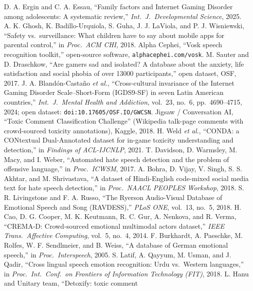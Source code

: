 D. A. Ergin and C. A. Essau, ``Family factors and Internet Gaming
Disorder among adolescents: A systematic review,'' \emph{Int.\ J.\ Developmental
Science}, 2025.
 A. K. Ghosh, K. Badillo-Urquiola, S. Guha, J. J. LaViola, and
P. J. Wisniewski, ``Safety vs.\ surveillance: What children have to say about mobile apps for
parental control,'' in \emph{Proc.\ ACM CHI}, 2018.
 Alpha Cephei, ``Vosk speech recognition toolkit,'' open-source
software, \texttt{alphacephei.com/vosk}.
 M. Sauter and D. Draschkow, ``Are gamers sad and isolated? A
database about the anxiety, life satisfaction and social phobia of over 13000
participants,'' open dataset, OSF, 2017.
 J. A. Bland\'on-Casta\~no \emph{et al.}, ``Cross-cultural invariance of
the Internet Gaming Disorder Scale--Short-Form (IGDS9-SF) in seven Latin American countries,''
\emph{Int.\ J.\ Mental Health and Addiction}, vol.~23, no.~6, pp.~4690--4715, 2024;
open dataset: \texttt{doi:10.17605/OSF.IO/GWCSN}.
 Jigsaw / Conversation AI, ``Toxic Comment Classification
Challenge'' (Wikipedia talk-page comments with crowd-sourced toxicity annotations),
Kaggle, 2018.
 H. Weld \emph{et al.}, ``CONDA: a CONtextual Dual-Annotated dataset
for in-game toxicity understanding and detection,'' in \emph{Findings of ACL-IJCNLP},
2021.
 T. Davidson, D. Warmsley, M. Macy, and I. Weber, ``Automated hate
speech detection and the problem of offensive language,'' in \emph{Proc.\ ICWSM}, 2017.
 A. Bohra, D. Vijay, V. Singh, S. S. Akhtar, and M. Shrivastava,
``A dataset of Hindi-English code-mixed social media text for hate speech
detection,'' in \emph{Proc.\ NAACL PEOPLES Workshop}, 2018.
 S. R. Livingstone and F. A. Russo, ``The Ryerson Audio-Visual
Database of Emotional Speech and Song (RAVDESS),'' \emph{PLoS ONE}, vol.\ 13, no.\ 5,
2018.
 H. Cao, D. G. Cooper, M. K. Keutmann, R. C. Gur, A. Nenkova, and
R. Verma, ``CREMA-D: Crowd-sourced emotional multimodal actors dataset,'' \emph{IEEE
Trans.\ Affective Computing}, vol.~5, no.~4, 2014.
 F. Burkhardt, A. Paeschke, M. Rolfes, W. F. Sendlmeier, and B. Weiss,
``A database of German emotional speech,'' in \emph{Proc.\ Interspeech}, 2005.
 S. Latif, A. Qayyum, M. Usman, and J. Qadir, ``Cross lingual speech
emotion recognition: Urdu vs.\ Western languages,'' in \emph{Proc.\ Int.\ Conf.\ on
Frontiers of Information Technology (FIT)}, 2018.
 L. Hanu and Unitary team, ``Detoxify: toxic comment
